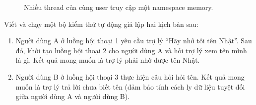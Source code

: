 \begin{figure}[H]
\centering
{}
\caption{Nhiều thread của cùng user truy cập một namespace memory.}
\label{fig:user-store}
\end{figure}

\begin{aicheckpoint}
Viết và chạy một bộ kiểm thử tự động giả lập hai kịch bản sau:
\begin{enumerate}
  \item Người dùng A ở luồng hội thoại 1 yêu cầu trợ lý ``Hãy nhớ tôi tên Nhật''. Sau đó, khởi tạo luồng hội thoại 2 cho người dùng A và hỏi trợ lý xem tên mình là gì. Kết quả mong muốn là trợ lý phải nhớ được tên Nhật.
  \item Người dùng B ở luồng hội thoại 3 thực hiện câu hỏi hỏi tên. Kết quả mong muốn là trợ lý trả lời chưa biết tên (đảm bảo tính cách ly dữ liệu tuyệt đối giữa người dùng A và người dùng B).
\end{enumerate}
\end{aicheckpoint}
